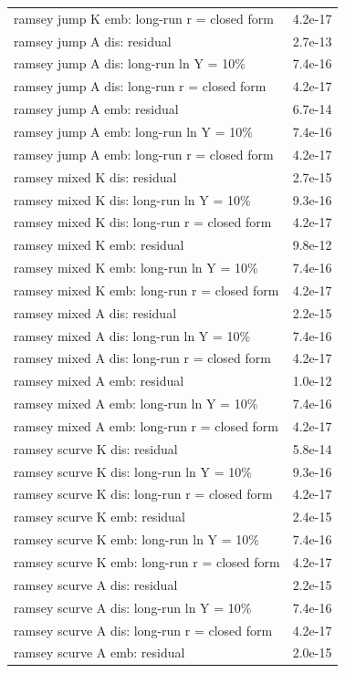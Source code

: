 \begin{tabular}{lc}
ramsey jump K emb: long-run r = closed form & 4.2e-17\\
ramsey jump A dis: residual & 2.7e-13\\
ramsey jump A dis: long-run ln Y = 10\% & 7.4e-16\\
ramsey jump A dis: long-run r = closed form & 4.2e-17\\
ramsey jump A emb: residual & 6.7e-14\\
ramsey jump A emb: long-run ln Y = 10\% & 7.4e-16\\
ramsey jump A emb: long-run r = closed form & 4.2e-17\\
ramsey mixed K dis: residual & 2.7e-15\\
ramsey mixed K dis: long-run ln Y = 10\% & 9.3e-16\\
ramsey mixed K dis: long-run r = closed form & 4.2e-17\\
ramsey mixed K emb: residual & 9.8e-12\\
ramsey mixed K emb: long-run ln Y = 10\% & 7.4e-16\\
ramsey mixed K emb: long-run r = closed form & 4.2e-17\\
ramsey mixed A dis: residual & 2.2e-15\\
ramsey mixed A dis: long-run ln Y = 10\% & 7.4e-16\\
ramsey mixed A dis: long-run r = closed form & 4.2e-17\\
ramsey mixed A emb: residual & 1.0e-12\\
ramsey mixed A emb: long-run ln Y = 10\% & 7.4e-16\\
ramsey mixed A emb: long-run r = closed form & 4.2e-17\\
ramsey scurve K dis: residual & 5.8e-14\\
ramsey scurve K dis: long-run ln Y = 10\% & 9.3e-16\\
ramsey scurve K dis: long-run r = closed form & 4.2e-17\\
ramsey scurve K emb: residual & 2.4e-15\\
ramsey scurve K emb: long-run ln Y = 10\% & 7.4e-16\\
ramsey scurve K emb: long-run r = closed form & 4.2e-17\\
ramsey scurve A dis: residual & 2.2e-15\\
ramsey scurve A dis: long-run ln Y = 10\% & 7.4e-16\\
ramsey scurve A dis: long-run r = closed form & 4.2e-17\\
ramsey scurve A emb: residual & 2.0e-15\\

\end{tabular}
